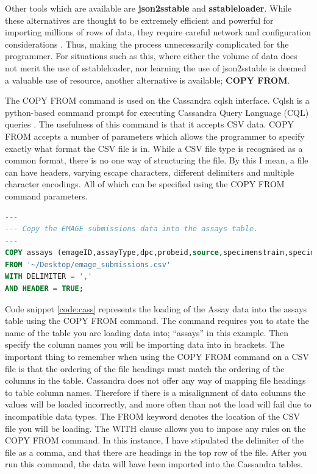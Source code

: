 Other tools which are available are \textbf{json2sstable} and \textbf{sstableloader}. While these alternatives are thought to be extremely efficient and powerful for importing millions of rows of data, they require careful network and configuration considerations \cite{cass}. Thus, making the process unnecessarily complicated for the programmer. For situations such as this, where either the volume of data does not merit the use of sstableloader, nor learning the use of json2sstable is deemed a valuable use of resource, another alternative is available; \textbf{COPY FROM}.

The COPY FROM command is used on the Cassandra cqlsh interface. Cqlsh is a python-based command prompt for executing Cassandra Query Language (CQL) queries \cite{ds}. The usefulness of this command is that it accepts CSV data. COPY FROM accepts a number of parameters which allows the programmer to specify exactly what format the CSV file is in. While a CSV file type is recognised as a common format, there is no one way of structuring the file. By this I mean, a file can have headers, varying escape characters, different delimiters and multiple character encodings. All of which can be specified using the COPY FROM command parameters.

\begin{lstlisting}[language=SQL, caption=Loading data into Apache Cassandra using the cqlsh interface., label=code:cass]
---
--- Copy the EMAGE submissions data into the assays table.
---
COPY assays (emageID,assayType,dpc,probeid,source,specimenstrain,specimentype,theilerstage)
FROM '~/Desktop/emage_submissions.csv'
WITH DELIMITER = ','
AND HEADER = TRUE;
\end{lstlisting}

Code snippet \ref{code:cass} represents the loading of the Assay data into the assays table using the COPY FROM command. The command requires you to state the name of the table you are loading data into; ``assays'' in this example. Then specify the column names you will be importing data into in brackets.  The important thing to remember when using the COPY FROM command on a CSV file is that the ordering of the file headings must match the ordering of the columns in the table. Cassandra does not offer any way of mapping file headings to table column names. Therefore if there is a misalignment of data columns the values will be loaded incorrectly, and more often than not the load will fail due to incompatible data types. The FROM keyword denotes the location of the CSV file you will be loading. The WITH clause allows you to impose any rules on the COPY FROM command. In this instance, I have stipulated the delimiter of the file as a comma, and that there are headings in the top row of the file. After you run this command, the data will have been imported into the Cassandra tables.

